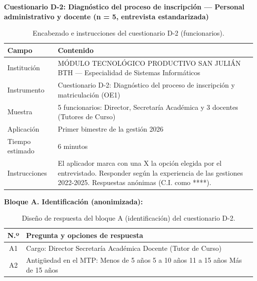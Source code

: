 \vspace{0.4cm}
\noindent\textbf{Cuestionario D-2: Diagnóstico del proceso de inscripción --- Personal administrativo y docente (n = 5, entrevista estandarizada)}

\begin{table}[htbp]
    \centering
    \caption{Encabezado e instrucciones del cuestionario D-2 (funcionarios).}
    \label{tab:d2_encabezado}
    \begin{tabularx}{\textwidth}{p{} X}
        \toprule
        \textbf{Campo} & \textbf{Contenido} \\
        \midrule
        Institución & MÓDULO TECNOLÓGICO PRODUCTIVO SAN JULIÁN BTH --- Especialidad de Sistemas Informáticos \\
        Instrumento & Cuestionario D-2: Diagnóstico del proceso de inscripción y matriculación (OE1) \\
        Muestra & 5 funcionarios: Director, Secretaría Académica y 3 docentes (Tutores de Curso) \\
        Aplicación & Primer bimestre de la gestión 2026 \\
        Tiempo estimado & 6 minutos \\
        Instrucciones & El aplicador marca con una X la opción elegida por el entrevistado. Responder según la experiencia de las gestiones 2022-2025. Respuestas anónimas (C.I. como ****). \\
        \bottomrule
    \end{tabularx}
\end{table}

\noindent\textbf{Bloque A. Identificación (anonimizada):}

\begin{table}[htbp]
    \centering
    \caption{Diseño de respuesta del bloque A (identificación) del cuestionario D-2.}
    \label{tab:d2_identificacion}
    \begin{tabularx}{\textwidth}{c L}
        \toprule
        \textbf{N.º} & \textbf{Pregunta y opciones de respuesta} \\
        \midrule
        A1 & Cargo: \casilla{} Director \quad \casilla{} Secretaría Académica \quad \casilla{} Docente (Tutor de Curso) \\
        A2 & Antigüedad en el MTP: \casilla{} Menos de 5 años \quad \casilla{} 5 a 10 años \quad \casilla{} 11 a 15 años \quad \casilla{} Más de 15 años \\
        \bottomrule
    \end{tabularx}
\end{table}

